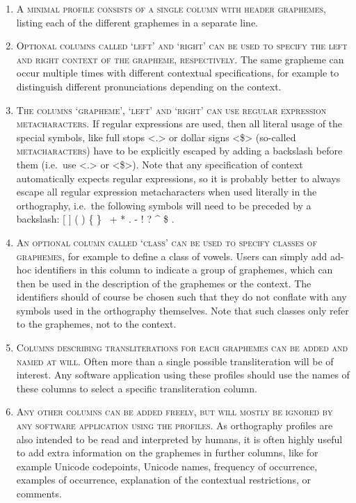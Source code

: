 \begin{enumerate}
	\def\labelenumi{\arabic{enumi}.} 
	\item \textsc{A minimal profile consists of a single column with header \textsc{graphemes}}, listing each of the different graphemes in a separate line. 
	\item \textsc{Optional columns called `left' and `right' can be used to specify the left and right context of the grapheme, respectively.} The same grapheme can occur multiple times with different contextual specifications, for example to distinguish different pronunciations depending on the context. 
	\item \textsc{The columns `grapheme', `left' and `right' can use regular expression metacharacters.} If regular expressions are used, then all literal usage of the special symbols, like full stops <.> or dollar signs <\$> (so-called \textsc{metacharacters}) have to be explicitly escaped by adding a backslash before them (i.e.~use <.> or <\$>). Note that any specification of context automatically expects regular expressions, so it is probably better to always escape all regular expression metacharacters when used literally in the orthography, i.e.~the following symbols will need to be preceded by a backslash: {[} {]} ( ) \{ \} ~+ * . - ! ? \^{} \$ . 
	\item \textsc{An optional column called `class' can be used to specify classes of graphemes}, for example to define a class of vowels. Users can simply add ad-hoc identifiers in this column to indicate a group of graphemes, which can then be used in the description of the graphemes or the context. The identifiers should of course be chosen such that they do not conflate with any symbols used in the orthography themselves. Note that such classes only refer to the graphemes, not to the context. 
	\item \textsc{Columns describing transliterations for each graphemes can be added and named at will}. Often more than a single possible transliteration will be of interest. Any software application using these profiles should use the names of these columns to select a specific transliteration column. 
	\item \textsc{Any other columns can be added freely, but will mostly be ignored by any software application using the profiles}. As orthography profiles are also intended to be read and interpreted by humans, it is often highly useful to add extra information on the graphemes in further columns, like for example Unicode codepoints, Unicode names, frequency of occurrence, examples of occurrence, explanation of the contextual restrictions, or comments. 
\end{enumerate}

